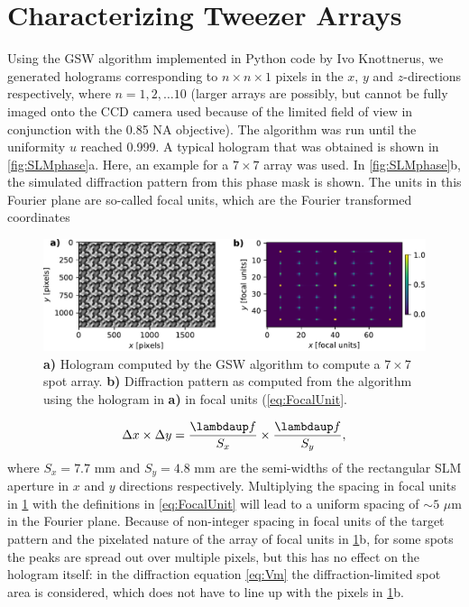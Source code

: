 \section{Characterizing Tweezer Arrays}\label{sec:ArraysResults}

Using the \ac{GSW} algorithm implemented in Python code by Ivo Knottnerus, we generated holograms corresponding to $n \times n \times 1$ pixels in the $x$, $y$ and $z$-directions respectively, where $n = 1,2,\ldots 10$ (larger arrays are possibly, but cannot be fully imaged onto the CCD camera used because of the limited field of view in conjunction with the 0.85 NA objective). 
The algorithm was run until the uniformity $u$ reached 0.999. 
A typical hologram that was obtained is shown in \cref{fig:SLMphase}a.
Here, an example for a $7 \times 7$ array was used. 
In \cref{fig:SLMphase}b, the simulated diffraction pattern from this phase mask is shown. 
The units in this Fourier plane are so-called focal units, which are the Fourier transformed coordinates \cite{Bijnen2015}

\begin{figure}
    \centering
    \includegraphics[width=\textwidth]{figures/MaskAndComputedPattern.pdf}
    \caption{\textbf{a)} Hologram computed by the \ac{GSW} algorithm to compute a $7\times7$ spot array.
    \textbf{b)} Diffraction pattern as computed from the algorithm using the hologram in \textbf{a)} in focal units (\cref{eq:FocalUnit}.}
    \label{fig:HologramPattern}
\end{figure}

\begin{equation}\label{eq:FocalUnit}
    \Delta x \times \Delta y = \frac{\lambdaup f}{S_x}\times \frac{\lambdaup f}{S_y},
\end{equation}
where $S_x = 7.7$ mm and $S_y = 4.8$ mm are the semi-widths of the rectangular SLM aperture in $x$ and $y$ directions respectively.
Multiplying the spacing in focal units in \cref{fig:HologramPattern} with the definitions in \cref{eq:FocalUnit} will lead to a uniform spacing of $\sim 5$ $\mu$m in the Fourier plane. 
Because of non-integer spacing in focal units of the target pattern and the pixelated nature of the array of focal units in \ref{fig:HologramPattern}b, for some spots the peaks are spread out over multiple pixels, but this has no effect on the hologram itself: in the diffraction equation \cref{eq:Vm} the diffraction-limited spot area is considered, which does not have to line up with the pixels in \cref{fig:HologramPattern}b.

